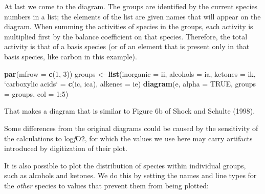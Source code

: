\documentclass[]{tufte-handout}
\newenvironment{Shaded}{}{}
\newcommand{\KeywordTok}[1]{\textcolor[rgb]{0.00,0.44,0.13}{\textbf{#1}}}
\newcommand{\DataTypeTok}[1]{\textcolor[rgb]{0.56,0.13,0.00}{#1}}
\newcommand{\DecValTok}[1]{\textcolor[rgb]{0.25,0.63,0.44}{#1}}
\newcommand{\StringTok}[1]{\textcolor[rgb]{0.25,0.44,0.63}{#1}}
\newcommand{\OtherTok}[1]{\textcolor[rgb]{0.00,0.44,0.13}{#1}}
\newcommand{\OperatorTok}[1]{\textcolor[rgb]{0.40,0.40,0.40}{#1}}
\newcommand{\NormalTok}[1]{#1}
\begin{document}
At last we come to the diagram. The groups are identified by the current
species numbers in a list; the elements of the list are given names that
will appear on the diagram. When summing the activities of species in
the groups, each activity is multiplied first by the balance coefficient
on that species. Therefore, the total activity is that of a basis
species (or of an element that is present only in that basis species,
like carbon in this example).

\begin{Shaded}
\begin{Highlighting}[]
\KeywordTok{par}\NormalTok{(}\DataTypeTok{mfrow =} \KeywordTok{c}\NormalTok{(}\DecValTok{1}\NormalTok{, }\DecValTok{3}\NormalTok{))}
\NormalTok{groups <-}\StringTok{ }\KeywordTok{list}\NormalTok{(}\DataTypeTok{inorganic =}\NormalTok{ ii, }\DataTypeTok{alcohols =}\NormalTok{ ia, }\DataTypeTok{ketones =}\NormalTok{ ik,}
               \StringTok{`}\DataTypeTok{carboxylic acids}\StringTok{`}\NormalTok{ =}\StringTok{ }\KeywordTok{c}\NormalTok{(ic, ica), }\DataTypeTok{alkenes =}\NormalTok{ ie)}
\KeywordTok{diagram}\NormalTok{(e, }\DataTypeTok{alpha =} \OtherTok{TRUE}\NormalTok{, }\DataTypeTok{groups =}\NormalTok{ groups, }\DataTypeTok{col =} \DecValTok{1}\OperatorTok{:}\DecValTok{5}\NormalTok{)}
\end{Highlighting}
\end{Shaded}

That makes a diagram that is similar to Figure 6b of Shock and Schulte
(1998).

\begin{marginfigure}
Some differences from the original diagrams could be caused by the
sensitivity of the calculations to log\emph{f}O2, for which the values
we use here may carry artifacts introduced by digitization of their
plot.
\end{marginfigure}

It is also possible to plot the distribution of species within
individual groups, such as alcohols and ketones. We do this by setting
the names and line types for the \emph{other} species to values that
prevent them from being plotted:
\end{document}
